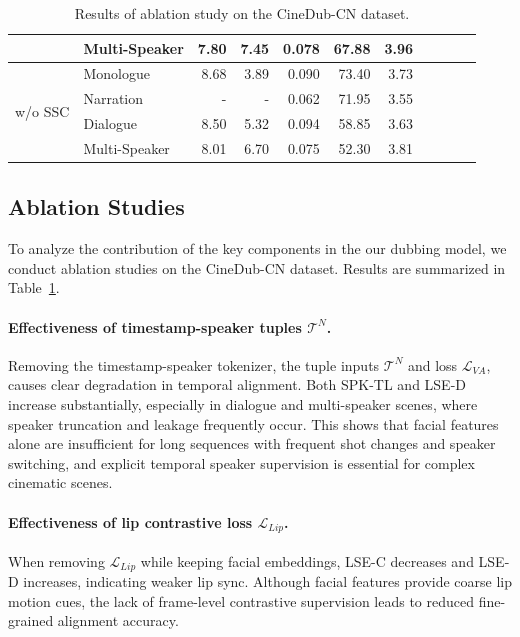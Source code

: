 \documentclass{article}
\begin{document}
\begin{table}
{\begin{tabular}{l|l|rrrrrrrrr}
                                            & Multi-Speaker & 7.80              & 7.45              & 0.078                 & 67.88                 & 3.96 \\
        \midrule                                        
        \multirow{4}{*}{w/o SSC}            & Monologue     & 8.68              & 3.89              & 0.090                 & 73.40                 & 3.73 \\
                                            & Narration     & -                 & -                 & 0.062                 & 71.95                 & 3.55 \\
                                            & Dialogue      & 8.50              & 5.32              & 0.094                 & 58.85                 & 3.63 \\
                                            & Multi-Speaker & 8.01              & 6.70              & 0.075                 & 52.30                 & 3.81 \\

        \bottomrule
    \end{tabular}
    }
\caption{Results of ablation study on the CineDub-CN dataset.}
\label{tab:2}
\end{table}


\subsection{Ablation Studies}
To analyze the contribution of the key components in the our dubbing model,
we conduct ablation studies on the CineDub-CN dataset.
Results are summarized in Table~\ref{tab:2}.

\paragraph{Effectiveness of timestamp-speaker tuples $\mathcal{T}^N$.}
Removing the timestamp-speaker tokenizer, the tuple inputs $\mathcal{T}^N$ and loss $\mathcal{L}_{VA}$,
causes clear degradation in temporal alignment.
Both SPK-TL and LSE-D increase substantially, especially in dialogue and multi-speaker scenes, where speaker truncation and leakage frequently occur.
This shows that facial features alone are insufficient for long sequences with frequent shot changes and speaker switching, 
and explicit temporal speaker supervision is essential for complex cinematic scenes.

\paragraph{Effectiveness of lip contrastive loss $\mathcal{L}_{Lip}$.}
When removing $\mathcal{L}_{Lip}$ while keeping facial embeddings, LSE-C decreases and LSE-D increases, indicating weaker lip sync.
Although facial features provide coarse lip motion cues, the lack of frame-level contrastive supervision leads to reduced fine-grained alignment accuracy.
\end{document}
